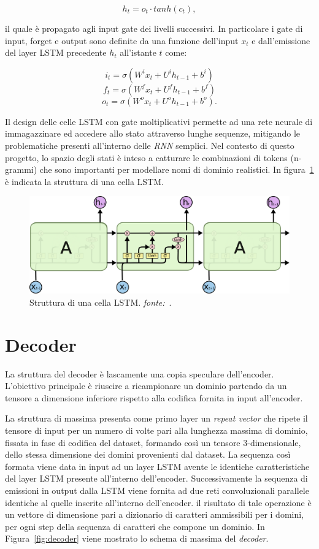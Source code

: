 \[h_t = o_t \cdot tanh(c_t),\]

il quale è propagato agli input gate dei livelli successivi. In particolare i gate di input, forget e output sono definite da una funzione dell'input $x_t$  e dall'emissione del layer LSTM precedente $h_t$ all'istante $t$ come:

\[i_t=\sigma\left(W^ix_t+U^ih_{t-1}+b^i\right)\]
\[f_t=\sigma\left(W^fx_t+U^fh_{t-1}+b^f\right)\]
\[o_t=\sigma\left(W^ox_t+U^oh_{t-1}+b^o\right).\]


Il design delle celle LSTM con gate moltiplicativi permette ad una rete neurale di immagazzinare ed accedere allo stato attraverso lunghe sequenze, mitigando le problematiche presenti all'interno delle \textit{RNN} semplici. Nel contesto di questo progetto, lo spazio degli stati è inteso a catturare le combinazioni di tokens (n-grammi) che sono importanti per modellare nomi di dominio realistici. In figura~\ref{fig:lstm} è indicata la struttura di una cella LSTM.

\begin{figure}[!bp]
    \centering
	\includegraphics[width=\columnwidth]{figures/LSTM3-chain.png}
	\caption{Struttura di una cella LSTM. \textit{fonte:}~\cite{lstmblog}.
\label{fig:lstm}}
\end{figure}


\newpage
\section{Decoder}
\label{decoder}
La struttura del decoder è lascamente una copia speculare dell'encoder. L'obiettivo principale è riuscire a ricampionare un dominio partendo da un tensore a dimensione inferiore rispetto alla codifica fornita in input all'encoder.

La struttura di massima presenta come primo layer un \textit{repeat vector} che ripete il tensore di input per un numero di volte pari alla lunghezza massima di dominio, fissata in fase di codifica del dataset, formando così un tensore 3-dimensionale, dello stessa dimensione dei domini provenienti dal dataset. La sequenza così formata viene data in input ad un layer LSTM avente le identiche caratteristiche del layer LSTM presente all'interno dell'encoder. Successivamente la sequenza di emissioni in output dalla LSTM viene fornita ad due reti convoluzionali parallele identiche al quelle inserite all'interno dell'encoder. il risultato di tale operazione è un vettore di dimensione pari a dizionario di caratteri ammissibili per i domini, per ogni step della sequenza di caratteri che compone un dominio. In Figura~\ref{fig:decoder} viene mostrato lo schema di massima del \textit{decoder}.

